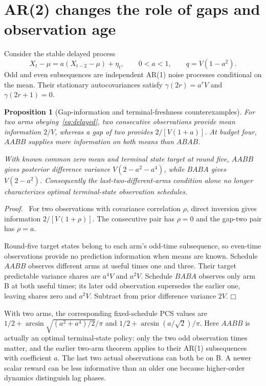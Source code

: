 \documentclass[11pt]{article}
\newtheorem{proposition}[theorem]{Proposition}
\newenvironment{proof}{\par\noindent\textit{Proof.}\ }{\hfill$\mdlgwhtsquare$\par\medskip}
\begin{document}
\section{AR(2) changes the role of gaps and observation age}
Consider the stable delayed process
\begin{equation}
X_t-\mu=a(X_{t-2}-\mu)+\eta_t,\qquad 0<a<1,
\qquad q=V(1-a^2).
\label{eq:delayed}
\end{equation}
Odd and even subsequences are independent AR(1) noise processes conditional on the mean. Their stationary autocovariances satisfy
$\gamma(2r)=a^rV$ and $\gamma(2r+1)=0$.

\begin{proposition}[Gap-information and terminal-freshness counterexamples]
For two arms obeying~\eqref{eq:delayed}, two consecutive observations provide mean information $2/V$, whereas a gap of two provides $2/[V(1+a)]$. At budget four, $AABB$ supplies more information on both means than $ABAB$.

With known common zero mean and terminal state target at round five, $AABB$ gives posterior difference variance $V(2-a^2-a^4)$, while $BABA$ gives $V(2-a^2)$. Consequently the last-two-different-arms condition alone no longer characterizes optimal terminal-state observation schedules.
\end{proposition}
\begin{proof}
For two observations with covariance correlation $\rho$, direct inversion gives information $2/[V(1+\rho)]$. The consecutive pair has $\rho=0$ and the gap-two pair has $\rho=a$.

Round-five target states belong to each arm's odd-time subsequence, so even-time observations provide no prediction information when means are known. Schedule $AABB$ observes different arms at useful times one and three. Their target predictable variance shares are $a^4V$ and $a^2V$. Schedule $BABA$ observes only arm B at both useful times; its later odd observation supersedes the earlier one, leaving shares zero and $a^2V$. Subtract from prior difference variance $2V$.
\end{proof}
With two arms, the corresponding fixed-schedule PCS values are $1/2+\arcsin\sqrt{(a^2+a^4)/2}/\pi$ and $1/2+\arcsin(a/\sqrt2)/\pi$. Here $AABB$ is actually an optimal terminal-state policy: only the two odd observation times matter, and the earlier two-arm theorem applies to their AR(1) subsequences with coefficient $a$. The last two actual observations can both be on B. A newer scalar reward can be less informative than an older one because higher-order dynamics distinguish lag phases.
\end{document}
